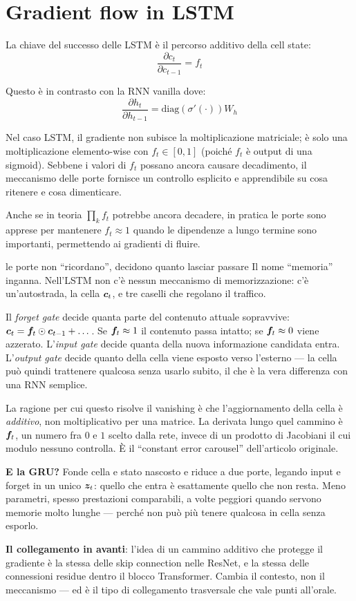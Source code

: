 \section{Gradient flow in LSTM}

La chiave del successo delle LSTM è il percorso additivo della cell state:
\[
\frac{\partial c_t}{\partial c_{t-1}} = f_t
\]

Questo è in contrasto con la RNN vanilla dove:
\[
\frac{\partial h_t}{\partial h_{t-1}} = \text{diag}(\sigma'(\cdot)) W_h
\]

Nel caso LSTM, il gradiente non subisce la moltiplicazione matriciale; è solo una moltiplicazione elemento-wise con $f_t \in [0, 1]$ (poiché $f_t$ è output di una sigmoid). Sebbene i valori di $f_t$ possano ancora causare decadimento, il meccanismo delle porte fornisce un controllo esplicito e apprendibile su cosa ritenere e cosa dimenticare.

\begin{tcolorbox}[title=Vanishing gradient mitigation]
Anche se in teoria $\prod_k f_t$ potrebbe ancora decadere, in pratica le porte sono apprese per mantenere $f_t \approx 1$ quando le dipendenze a lungo termine sono importanti, permettendo ai gradienti di fluire.
\end{tcolorbox}

\begin{intuizione}{le porte non ``ricordano'', decidono quanto lasciar passare}
Il nome ``memoria'' inganna. Nell'LSTM non c'è nessun meccanismo di memorizzazione: c'è un'autostrada, la cella $\bm{c}_t$, e tre caselli che regolano il traffico.

Il \emph{forget gate} decide quanta parte del contenuto attuale sopravvive: $\bm{c}_t = \bm{f}_t \odot \bm{c}_{t-1} + \dots$. Se $\bm{f}_t \approx 1$ il contenuto passa intatto; se $\bm{f}_t \approx 0$ viene azzerato. L'\emph{input gate} decide quanta della nuova informazione candidata entra. L'\emph{output gate} decide quanto della cella viene esposto verso l'esterno — la cella può quindi trattenere qualcosa senza usarlo subito, il che è la vera differenza con una RNN semplice.

La ragione per cui questo risolve il vanishing è che l'aggiornamento della cella è \emph{additivo}, non moltiplicativo per una matrice. La derivata lungo quel cammino è $\bm{f}_t$, un numero fra $0$ e $1$ scelto dalla rete, invece di un prodotto di Jacobiani il cui modulo nessuno controlla. È il ``constant error carousel'' dell'articolo originale.

\textbf{E la GRU?} Fonde cella e stato nascosto e riduce a due porte, legando input e forget in un unico $\bm{z}_t$: quello che entra è esattamente quello che non resta. Meno parametri, spesso prestazioni comparabili, a volte peggiori quando servono memorie molto lunghe — perché non può più tenere qualcosa in cella senza esporlo.

\textbf{Il collegamento in avanti}: l'idea di un cammino additivo che protegge il gradiente è la stessa delle skip connection nelle ResNet, e la stessa delle connessioni residue dentro il blocco Transformer. Cambia il contesto, non il meccanismo — ed è il tipo di collegamento trasversale che vale punti all'orale.
\end{intuizione}

